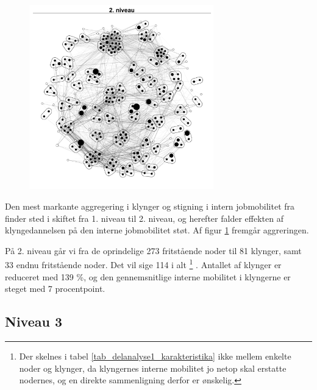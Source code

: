 \begin{figure}
  \vspace{-20pt}
  \begin{center}
   \caption{}
   \label{fig_delanalyse1_kort_seg_proces2}
    \includegraphics[width=8cm]{fig/netvaerkskort/kort_seg_proces2.pdf}
    \label{fig_delanalyse1_kort_seg_proces2}
  \end{center}
  \vspace{-20pt}
\end{figure}

Den mest markante aggregering i klynger og stigning i intern jobmobilitet fra finder sted i skiftet fra 1. niveau til 2. niveau, og herefter falder effekten af klyngedannelsen på den interne jobmobilitet støt. Af figur \ref{fig_delanalyse1_kort_seg_proces2} fremgår aggreringen. 

På 2. niveau går vi fra de oprindelige 273 fritstående noder til 81 klynger, samt 33 endnu fritstående noder. Det vil sige 114 i alt%
%
\footnote{ Der skelnes i tabel \ref{tab_delanalyse1_karakteristika} ikke mellem enkelte noder og klynger, da klyngernes interne mobilitet jo netop skal erstatte nodernes, og en direkte sammenligning derfor er ønskelig. }%
%
. Antallet af klynger er reduceret med 139 \%, og den gennemsnitlige interne mobilitet i klyngerne er steget med 7 procentpoint.


\newpage \subsection{Niveau 3}

